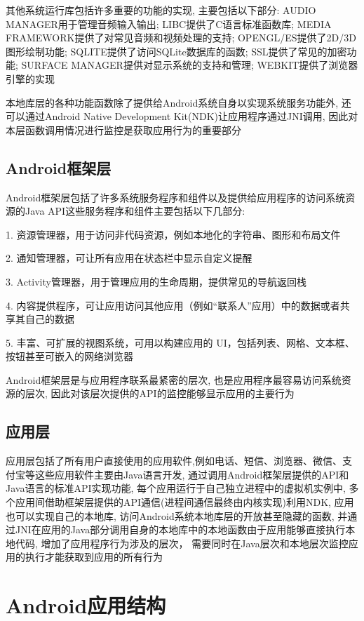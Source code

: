 其他系统运行库包括许多重要的功能的实现, 主要包括以下部分: 
AUDIO MANAGER用于管理音频输入输出; 
LIBC提供了C语言标准函数库; 
MEDIA FRAMEWORK提供了对常见音频和视频处理的支持; 
OPENGL/ES提供了2D/3D图形绘制功能;
SQLITE提供了访问SQLite数据库的函数;
SSL提供了常见的加密功能;
SURFACE MANAGER提供对显示系统的支持和管理;
WEBKIT提供了浏览器引擎的实现\juhao

本地库层的各种功能函数除了提供给Android系统自身以实现系统服务功能外, 还可以通过Android Native Development Kit(NDK)让应用程序通过JNI调用, 因此对本层函数调用情况进行监控是获取应用行为的重要部分\juhao

\subsection*{Android框架层}
Android框架层包括了许多系统服务程序和组件以及提供给应用程序的访问系统资源的Java API\juhao 这些服务程序和组件主要包括以下几部分:

1. 资源管理器，用于访问非代码资源，例如本地化的字符串、图形和布局文件

2. 通知管理器，可让所有应用在状态栏中显示自定义提醒

3. Activity管理器，用于管理应用的生命周期，提供常见的导航返回栈

4. 内容提供程序，可让应用访问其他应用（例如“联系人”应用）中的数据或者共享其自己的数据

5. 丰富、可扩展的视图系统，可用以构建应用的 UI，包括列表、网格、文本框、按钮甚至可嵌入的网络浏览器

Android框架层是与应用程序联系最紧密的层次, 也是应用程序最容易访问系统资源的层次, 因此对该层次提供的API的监控能够显示应用的主要行为\juhao

\subsection*{应用层}
应用层包括了所有用户直接使用的应用软件,例如电话、短信、浏览器、微信、支付宝等\juhao 这些应用软件主要由Java语言开发, 通过调用Android框架层提供的API和Java语言的标准API实现功能, 每个应用运行于自己独立进程中的虚拟机实例中, 多个应用间借助框架层提供的API通信(进程间通信最终由内核实现)\juhao 利用NDK, 应用也可以实现自己的本地库, 访问Android系统本地库层的开放甚至隐藏的函数, 并通过JNI在应用的Java部分调用自身的本地库中的本地函数\juhao 由于应用能够直接执行本地代码, 增加了应用程序行为涉及的层次， 需要同时在Java层次和本地层次监控应用的执行才能获取到应用的所有行为\juhao


\section{Android应用结构}
